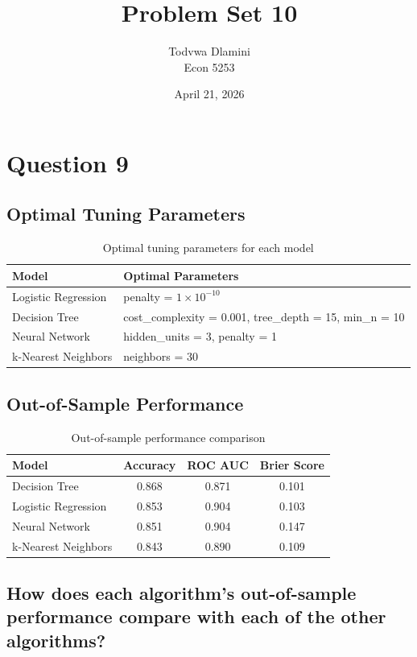 \documentclass{article}
\title{Problem Set 10}
\author{Todvwa Dlamini \\ Econ 5253}
\date{April 21, 2026}
\begin{document}
\maketitle

\section*{Question 9}


\subsection*{Optimal Tuning Parameters}

\begin{table}[H]
\centering
\begin{tabular}{ll}
\toprule
Model & Optimal Parameters \\
\midrule
Logistic Regression & penalty = $1 \times 10^{-10}$ \\
Decision Tree & cost\_complexity = 0.001, tree\_depth = 15, min\_n = 10 \\
Neural Network & hidden\_units = 3, penalty = 1 \\
k-Nearest Neighbors & neighbors = 30 \\
\bottomrule
\end{tabular}
\caption{Optimal tuning parameters for each model}
\end{table}

\subsection*{Out-of-Sample Performance}

\begin{table}[H]
\centering
\begin{tabular}{lccc}
\toprule
Model & Accuracy & ROC AUC & Brier Score \\
\midrule
Decision Tree & 0.868 & 0.871 & 0.101 \\
Logistic Regression & 0.853 & 0.904 & 0.103 \\
Neural Network & 0.851 & 0.904 & 0.147 \\
k-Nearest Neighbors & 0.843 & 0.890 & 0.109 \\
\bottomrule
\end{tabular}
\caption{Out-of-sample performance comparison}
\end{table}

\subsection*{How does each algorithm’s out-of-sample performance compare
with each of the other algorithms?}
\end{document}
